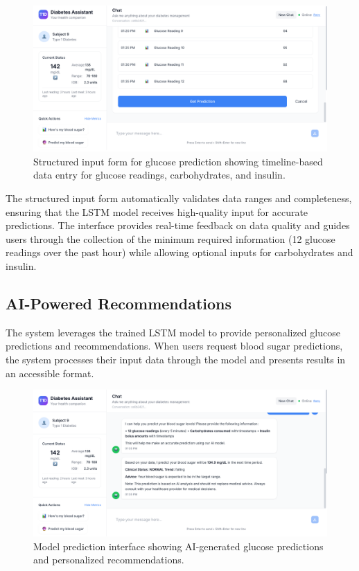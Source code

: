 \documentclass[acmsmall]{acmart}
\begin{document}
\begin{figure}[h]
  \centering
  \includegraphics[width=\linewidth]{images/Structured_Input.png}
  \caption{Structured input form for glucose prediction showing timeline-based data entry for glucose readings, carbohydrates, and insulin.}
  \label{fig:structured_input}
\end{figure}

The structured input form automatically validates data ranges and completeness, ensuring that the LSTM model receives high-quality input for accurate predictions. The interface provides real-time feedback on data quality and guides users through the collection of the minimum required information (12 glucose readings over the past hour) while allowing optional inputs for carbohydrates and insulin.

\subsection{AI-Powered Recommendations}

The system leverages the trained LSTM model to provide personalized glucose predictions and recommendations. When users request blood sugar predictions, the system processes their input data through the model and presents results in an accessible format.

\begin{figure}[h]
  \centering
  \includegraphics[width=\linewidth]{images/Model_Prediction.png}
  \caption{Model prediction interface showing AI-generated glucose predictions and personalized recommendations.}
  \label{fig:model_prediction}
\end{figure}
\end{document}
